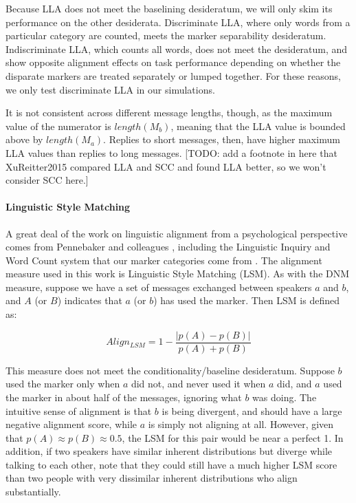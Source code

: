 \documentclass{acm_proc_article-sp}
\begin{document}
Because LLA does not meet the baselining desideratum, we will only skim its performance on the other desiderata. Discriminate LLA, where only words from a particular category are counted, meets the marker separability desideratum.  Indiscriminate LLA, which counts all words, does not meet the desideratum, and \cite{FusaroliEtAl2012} show opposite alignment effects on task performance depending on whether the disparate markers are treated separately or lumped together.  For these reasons, we only test discriminate LLA in our simulations.

It is not consistent across different message lengths, though, as the maximum value of the numerator is $length(M_b)$, meaning that the LLA value is bounded above by $length(M_a)$. Replies to short messages, then, have higher maximum LLA values than replies to long messages. [TODO: add a footnote in here that XuReitter2015 compared LLA and SCC and found LLA better, so we won't consider SCC here.]

\paragraph{Linguistic Style Matching} A great deal of the work on linguistic alignment from a psychological perspective comes from Pennebaker and colleagues \cite{NiederhofferPennebaker2002,GonzalesHancockPennebaker2010,IrelandEtAl2011}, including the Linguistic Inquiry and Word Count system that our marker categories come from \cite{LIWC}.  The alignment measure used in this work is Linguistic Style Matching (LSM). As with the DNM measure, suppose we have a set of messages exchanged between speakers $a$ and $b$, and $A$ (or $B$) indicates that $a$ (or $b$) has used the marker. Then LSM is defined as:

\begin{equation}
Align_{LSM} = 1 - \frac{|p(A)-p(B)|}{p(A)+p(B)}
\end{equation}

This measure does not meet the conditionality/baseline desideratum. Suppose $b$ used the marker only when $a$ did not, and never used it when $a$ did, and $a$ used the marker in about half of the messages, ignoring what $b$ was doing.  The intuitive sense of alignment is that $b$ is being divergent, and should have a large negative alignment score, while $a$ is simply not aligning at all. However, given that $p(A) \approx p(B) \approx 0.5$, the LSM for this pair would be near a perfect 1.  In addition, if two speakers have similar inherent distributions but diverge while talking to each other, note that they could still have a much higher LSM score than two people with very dissimilar inherent distributions who align substantially.
\end{document}
